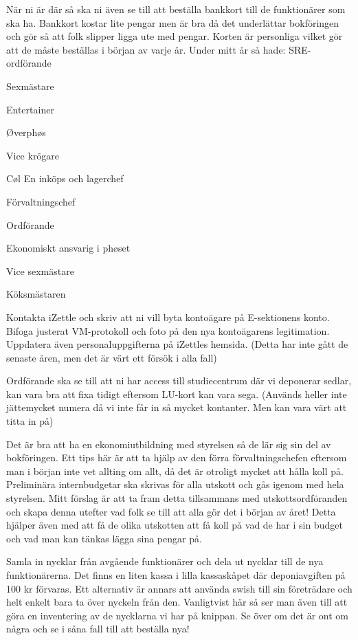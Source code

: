 \documentclass[10pt]{article}
\begin{document}
När ni är där så ska ni även se till att beställa bankkort till de funktionärer som ska ha. Bankkort kostar lite pengar men är bra då det underlättar bokföringen och gör så att folk slipper ligga ute med pengar. Korten är personliga vilket gör att de måste beställas i början av varje år. Under mitt år så hade:
SRE-ordförande

Sexmästare

Entertainer

Øverphøs

Vice krögare

Cøl
En inköps och lagerchef

Förvaltningschef

Ordförande

Ekonomiskt ansvarig i phøset

Vice sexmästare

Köksmästaren

Kontakta iZettle och skriv att ni vill byta kontoägare på E-sektionens konto. Bifoga justerat VM-protokoll och foto på den nya kontoägarens legitimation. Uppdatera även personaluppgifterna på iZettles hemsida. (Detta har inte gått de senaste åren, men det är värt ett försök i alla fall)

Ordförande ska se till att ni har access till studiecentrum där vi deponerar sedlar, kan vara bra att fixa tidigt eftersom LU-kort kan vara sega. (Används heller inte jättemycket numera då vi inte får in så mycket kontanter. Men kan vara värt att titta in på)

Det är bra att ha en ekonomiutbildning med styrelsen så de lär sig sin del av bokföringen. Ett tips här är att ta hjälp av den förra förvaltningschefen eftersom man i början inte vet allting om allt, då det är otroligt mycket att hålla koll på. 
Preliminära internbudgetar ska skrivas för alla utskott och gås igenom med hela styrelsen. Mitt förslag är att ta fram detta tillsammans med utskottsordföranden och skapa denna utefter vad folk se till att alla gör det i början av året! Detta hjälper även med att få de olika utskotten att få koll på vad de har i sin budget och vad man kan tänkas lägga sina pengar på.

Samla in nycklar från avgående funktionärer och dela ut nycklar till de nya funktionärerna. Det finns en liten kassa i lilla kassaskåpet där deponiavgiften på 100 kr förvaras. Ett alternativ är annars att använda swish till sin företrädare och helt enkelt bara ta över nyckeln från den.
Vanligtvist här så ser man även till att göra en inventering av de nycklarna vi har på knippan. Se över om det är ont om några och se i såna fall till att beställa nya!
\end{document}
